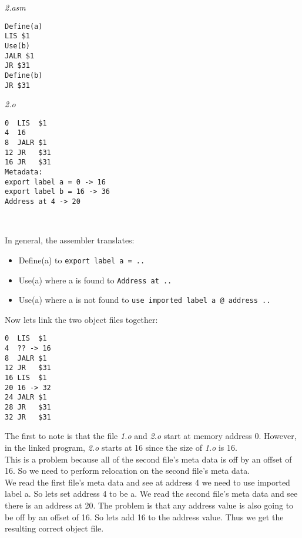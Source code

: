 \documentclass[12pt, letterpaper]{article}
\begin{document}
\begin{minipage}[t]{0.5\textwidth}
\emph{2.asm}
\begin{verbatim}
Define(a)
LIS $1
Use(b)
JALR $1
JR $31
Define(b)
JR $31
\end{verbatim}
\end{minipage}
\begin{minipage}[t]{0.5\textwidth}
\emph{2.o}
\begin{verbatim}
0  LIS  $1
4  16
8  JALR $1
12 JR   $31
16 JR   $31
Metadata:
export label a = 0 -> 16
export label b = 16 -> 36
Address at 4 -> 20
\end{verbatim}
\end{minipage}\\

\vspace{7mm}

In general, the assembler translates:
\begin{itemize}
\item Define(a) to \verb|export label a = ..|
\item Use(a) where a is found to \verb|Address at ..|
\item Use(a) where a is not found to \verb|use imported label a @ address ..|
\end{itemize}

Now lets link the two object files together:

\begin{verbatim}
0  LIS  $1
4  ?? -> 16
8  JALR $1
12 JR   $31
16 LIS  $1
20 16 -> 32
24 JALR $1
28 JR   $31
32 JR   $31
\end{verbatim}

The first to note is that the file \emph{1.o} and \emph{2.o} start at memory address 0. However, in the linked program, \emph{2.o} starts at 16 since the size of \emph{1.o} is 16.\\

This is a problem because all of the second file's meta data is off by an offset of 16. So we need to perform relocation on the second file's meta data.\\

We read the first file's meta data and see at address 4 we need to use imported label a. So lets set address 4 to be a. We read the second file's meta data and see there is an address at 20. The problem is that any address value is also going to be off by an offset of 16. So lets add 16 to the address value. Thus we get the resulting correct object file.
\end{document}
